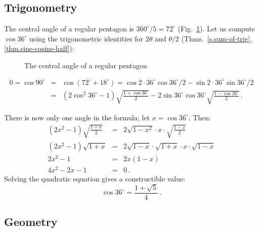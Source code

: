 \subsection{Trigonometry}
The central angle of a regular pentagon is $360^\circ/5=72^\circ$  (Fig.~\ref{f.hept-central-pentagon}). Let us compute $\cos 36^\circ$ using the  trigonometric identities for $2\theta$ and $\theta/2$ (Thms.~\ref{s.sum-of-trig}, \ref{thm.sine-cosine-half}):
\begin{figure}[t]
\begin{center}
\end{center}
\caption{The central angle of a regular pentagon}\label{f.hept-central-pentagon}
\end{figure}
\begin{eqnarray*}
0=\cos 90^\circ &=& \cos(72^\circ+18^\circ)=\cos 2\cdot 36^\circ\cos 36^\circ/2 - \sin 2\cdot 36^\circ\sin 36^\circ/2\\
&=&(2\cos^2 36^\circ-1)\sqrt{\frac{1+\cos 36^\circ}{2}}-2\sin 36^\circ\cos 36^\circ\sqrt{\frac{1-\cos 36^\circ}{2}}\,.
\end{eqnarray*}

\newpage

There is now only one angle in the formula; let $x=\cos 36^\circ$. Then:
\begin{eqnarray*}
(2x^2-1)\sqrt{\frac{1+x}{2}}&=&2\sqrt{1-x^2}\cdot x \cdot \sqrt{\frac{1-x}{2}}\\
(2x^2-1)\sqrt{1+x}&=&2\sqrt{1-x}\cdot\sqrt{1+x}\cdot x \cdot \sqrt{1-x}\\
2x^2-1&=&2x(1-x)\\
4x^2-2x-1&=&0\,.
\end{eqnarray*}
Solving the quadratic equation gives a constructible value:
\[
\cos 36^\circ = \frac{1+\sqrt{5}}{4}\,.
\]


\subsection{Geometry}\label{s.geometry-pentagon}

